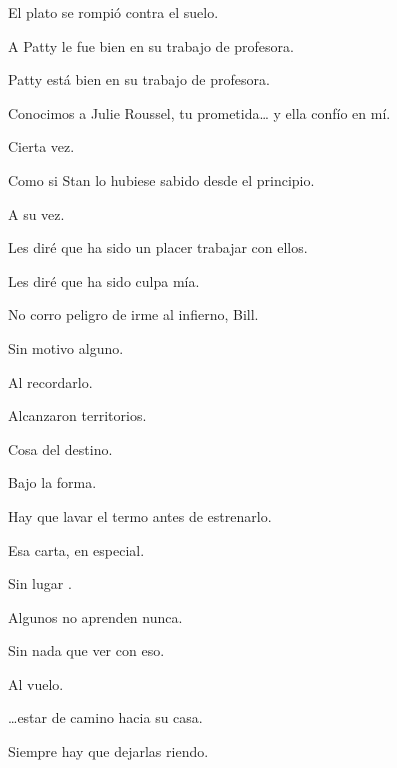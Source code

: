 \sk
El plato se rompió contra el suelo. \nb{}

\sk
A Patty le fue bien en su trabajo de profesora. 

\sk
Patty está bien en su trabajo de profesora. 

\sk
Conocimos a Julie Roussel, tu prometida\ldots{} y ella confío en mí. 

\sk
Cierta vez. 

\sk
Como si Stan lo hubiese sabido desde el principio. 

\sk
A su vez. 

\sk
Les diré que ha sido un placer trabajar con ellos. 

\sk
Les diré que ha sido culpa mía. 

\sk
No corro peligro de irme al infierno, Bill. 

\sk
Sin motivo alguno. 

\sk
Al recordarlo. 

\sk
Alcanzaron territorios. 

\sk
Cosa del destino. 

\sk
Bajo la forma. 

\sk
Hay que lavar el termo antes de estrenarlo. 

\sk
Esa carta, en especial. 

\sk
Sin lugar . 

\sk
Algunos no aprenden nunca. 

\sk
Sin nada que ver con eso. 

\sk
Al vuelo. 

\sk
{} 

\sk
\ldots{}estar de camino hacia su casa. 

\sk
Siempre hay que dejarlas riendo. 

